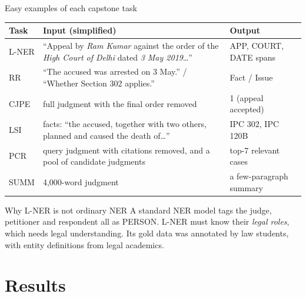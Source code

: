 \documentclass[aspectratio=169,11pt]{beamer}
\begin{document}
\begin{frame}{Easy examples of each capstone task}
  \scriptsize
  \begin{tabularx}{\textwidth}{@{}lXl@{}}
    \toprule
    Task & Input (simplified) & Output\\
    \midrule
    L-NER & ``Appeal by \emph{Ram Kumar} against the order of the \emph{High Court of Delhi} dated \emph{3 May 2019}\ldots'' & APP, COURT, DATE spans\\
    RR & ``The accused was arrested on 3 May.'' / ``Whether Section 302 applies.'' & Fact / Issue\\
    CJPE & full judgment with the final order removed & 1 (appeal accepted)\\
    LSI & facts: ``the accused, together with two others, planned and caused the death of\ldots'' & IPC 302, IPC 120B\\
    PCR & query judgment with citations removed, and a pool of candidate judgments & top-7 relevant cases\\
    SUMM & 4,000-word judgment & a few-paragraph summary\\
    \bottomrule
  \end{tabularx}
  \vspace{2mm}
  \begin{exampleblock}{Why L-NER is not ordinary NER}
    \small
    A standard NER model tags the judge, petitioner and respondent all as PERSON. L-NER must know their \emph{legal roles}, which needs legal understanding. Its gold data was annotated by law students, with entity definitions from legal academics.
  \end{exampleblock}
\end{frame}

\section{Results}
\end{document}
